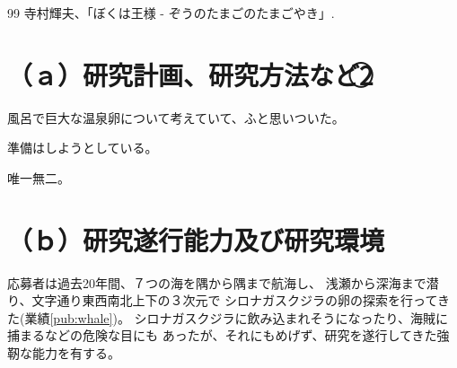 \documentclass[11pt,a4j,dvipdfmx]{jarticle} 					%
\newcommand{\研究課題名}{象の卵}
\newcommand{\研究機関名}{逢坂大学}
\newcommand{\研究代表者氏名}{湯川秀樹}
\newcommand{\研究期間の最終元号年度}{4}  %
\begin{document}
	\vspace{1cm}
	\begin{thebibliography}{99}
		 寺村輝夫、「ぼくは王様 - ぞうのたまごのたまごやき」.
	\end{thebibliography}




\section{ （ａ）研究計画、研究方法など\textcircled{2}}

		風呂で巨大な温泉卵について考えていて、ふと思いついた。

	準備はしようとしている。

	唯一無二。




\section{ （ｂ）研究遂行能力及び研究環境}

\PapersInstructions	%

	応募者は過去20年間、７つの海を隅から隅まで航海し、
	浅瀬から深海まで潜り、文字通り東西南北上下の３次元で
	シロナガスクジラの卵の探索を行ってきた(業績\ref{pub:whale})。
	シロナガスクジラに飲み込まれそうになったり、海賊に捕まるなどの危険な目にも
	あったが、それにもめげず、研究を遂行してきた強靭な能力を有する。
\end{document}
